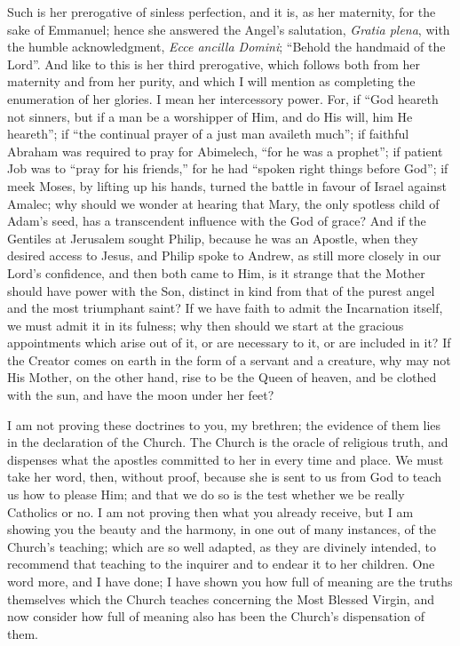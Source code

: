 Such is her prerogative of sinless perfection, and it is, as her
maternity, for the sake of Emmanuel; hence she answered the Angel's
salutation, \emph{Gratia plena}, with the humble acknowledgment, \emph{Ecce
ancilla Domini}; ``Behold the handmaid of the Lord''. And
like to this is her third prerogative, which follows both from her
maternity and from her purity, and which I will mention as completing
the enumeration of her glories. I mean her intercessory power. For, if
``God heareth not sinners, but if a man be a worshipper of Him,
and do His will, him He heareth''; if ``the continual prayer
of a just man availeth much''; if faithful Abraham was required to
pray for Abimelech, ``for he was a prophet''; if patient Job
was to ``pray for his friends,'' for he had ``spoken right
things before God''; if meek Moses, by lifting up his hands,
turned the battle in favour of Israel against Amalec; why should we
wonder at hearing that Mary, the only spotless child of Adam's seed,
has a transcendent influence with the God of grace? And if the
Gentiles at Jerusalem sought Philip, because he was an Apostle, when
they desired access to Jesus, and Philip spoke to Andrew, as still
more closely in our Lord's confidence, and then both came to Him, is
it strange that the Mother should have power with the Son, distinct in
kind from that of the purest angel and the most triumphant saint? If
we have faith to admit the Incarnation itself, we must admit it in its
fulness; why then should we start at the gracious appointments which
arise out of it, or are necessary to it, or are included in it? If the
Creator comes on earth in the form of a servant and a creature, why
may not His Mother, on the other hand, rise to be the Queen of heaven,
and be clothed with the sun, and have the moon under her feet?

I am not proving these doctrines to you, my brethren; the evidence
of them lies in the declaration of the Church. The Church is the
oracle of religious truth, and dispenses what the apostles committed
to her in every time and place. We must take her word, then, without
proof, because she is sent to us from God to teach us how to please
Him; and that we do so is the test whether we be really Catholics or
no. I am not proving then what you already receive, but I am showing
you the beauty and the harmony, in one out of many instances, of the
Church's teaching; which are so well adapted, as they are divinely
intended, to recommend that teaching to the inquirer and to endear it
to her children. One word more, and I have done; I have shown you how
full of meaning are the truths themselves which the Church teaches
concerning the Most Blessed Virgin, and now consider how full of
meaning also has been the Church's dispensation of them.

